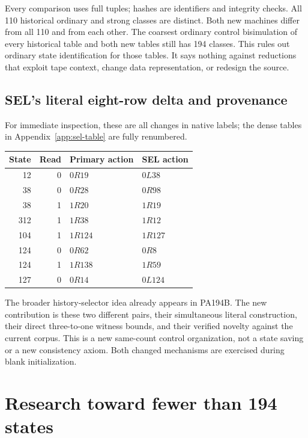 \documentclass[10pt,letterpaper]{article}
\begin{document}
Every comparison uses full tuples; hashes are identifiers and integrity
checks. All 110 historical ordinary and strong classes are distinct.
Both new machines differ from all 110 and from each other. The coarsest
ordinary control bisimulation of every historical table and both new
tables still has 194 classes. This rules out ordinary state identification
for those tables. It says nothing against reductions that exploit tape
context, change data representation, or redesign the source.



\subsection{SEL's literal eight-row delta and provenance}

For immediate inspection, these are all changes in native labels;
the dense tables in Appendix~\ref{app:sel-table} are fully renumbered.
\begin{center}\begin{tabular}{@{}rrll@{}}\toprule
State&Read&Primary action&SEL action\\\midrule
12&0&$0R19$&$0L38$\\
38&0&$0R28$&$0R98$\\
38&1&$1R20$&$1R19$\\
312&1&$1R38$&$1R12$\\
104&1&$1R124$&$1R127$\\
124&0&$0R62$&$0R8$\\
124&1&$1R138$&$1R59$\\
127&0&$0R14$&$0L124$\\\bottomrule
\end{tabular}\end{center}
The broader history-selector idea already appears in PA194B. The new
contribution is these two different pairs, their simultaneous literal
construction, their direct three-to-one witness bounds, and their
verified novelty against the current corpus. This is a new same-count
control organization, not a state saving or a new consistency axiom.
Both changed mechanisms are exercised during blank initialization.




\section{Research toward fewer than 194 states}
\label{sec:search}
\end{document}
